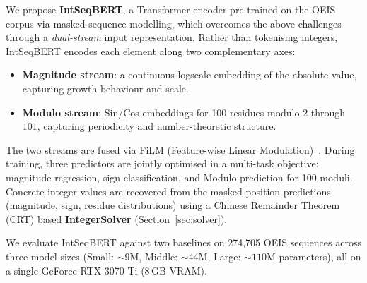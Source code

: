 We propose \textbf{IntSeqBERT}, a Transformer encoder pre-trained on the OEIS corpus via masked
sequence modelling, which overcomes the above challenges through a \emph{dual-stream} input
representation. Rather than tokenising integers, IntSeqBERT encodes each element along two
complementary axes:
\begin{itemize}
  \item \textbf{Magnitude stream}: a continuous log\-scale embedding of the
        absolute value, capturing growth behaviour and scale.
  \item \textbf{Modulo stream}: Sin/Cos embeddings for 100 residues modulo $2$ through $101$,
        capturing periodicity and number-theoretic structure.
\end{itemize}
The two streams are fused via FiLM (Feature-wise Linear Modulation)~\cite{perez2018film}.
During training, three predictors are jointly optimised in a multi-task objective: magnitude
regression, sign classification, and Modulo prediction for 100 moduli. Concrete integer values
are recovered from the masked-position predictions (magnitude, sign, residue distributions)
using a Chinese Remainder Theorem (CRT) based \textbf{IntegerSolver} (Section~\ref{sec:solver}).

We evaluate IntSeqBERT against two baselines on 274,705 OEIS sequences across three model
sizes (Small: ${\sim}9$M, Middle: ${\sim}44$M, Large: ${\sim}110$M parameters), all on a
single GeForce RTX 3070 Ti (8\,GB VRAM).

